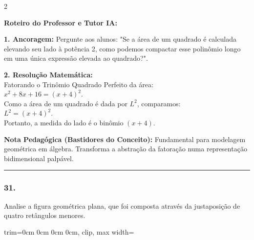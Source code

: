 \begin{multicols*}{2}
\ifgabarito
    \begin{tcolorbox}[colback=CorTitUm!5, colframe=CorTitUm, boxrule=1pt, arc=4pt, left=6pt, right=6pt, top=6pt, bottom=6pt]
    \small\textbf{\textcolor{CorTitUm}{Roteiro do Professor e Tutor IA:}}\par\vspace{0.1cm}
    \color{CinzaEscuro}
    \textbf{1. Ancoragem:} Pergunte aos alunos: "Se a área de um quadrado é calculada elevando seu lado à potência 2, como podemos compactar esse polinômio longo em uma única expressão elevada ao quadrado?".\par\vspace{0.1cm}
    \textbf{2. Resolução Matemática:}\\
    Fatorando o Trinômio Quadrado Perfeito da área:\\
    $x^2 + 8x + 16 = (x + 4)^2$.\\
    Como a área de um quadrado é dada por $L^2$, comparamos:\\
    $L^2 = (x + 4)^2$.\\
    Portanto, a medida do lado é o binômio $(x + 4)$.
    \end{tcolorbox}
    \vspace{0.15cm}
    
    \begin{boxexplicacao}
    \textbf{Nota Pedagógica (Bastidores do Conceito):} Fundamental para modelagem geométrica em álgebra. Transforma a abstração da fatoração numa representação bidimensional palpável.
    \end{boxexplicacao}
\fi

\par\vspace{\espacoQuestao}

\noindent\textcolor{CorLinha}{\rule{\linewidth}{0.5pt}} 
\par\vspace{\espacoPreQuestao}
\subsubsection*{31.} 
\begin{enunciadoLiteral}
Analise a figura geométrica plana, que foi composta através da justaposição de quatro retângulos menores. 

\begin{center}
\begin{adjustbox}{trim=0cm 0cm 0cm 0cm, clip, max width=\larguraTikz}
\end{adjustbox}
\end{center}
\end{enunciadoLiteral}
\end{multicols*}
